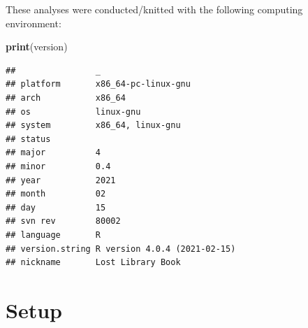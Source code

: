 \documentclass[]{book}
\newenvironment{Shaded}{\begin{snugshade}}{\end{snugshade}}
\newcommand{\KeywordTok}[1]{\textcolor[rgb]{0.13,0.29,0.53}{\textbf{#1}}}
\newcommand{\NormalTok}[1]{#1}
\begin{document}
These analyses were conducted/knitted with the following computing environment:

\begin{Shaded}
\begin{Highlighting}[]
\KeywordTok{print}\NormalTok{(version)}
\end{Highlighting}
\end{Shaded}

\begin{verbatim}
##                _                           
## platform       x86_64-pc-linux-gnu         
## arch           x86_64                      
## os             linux-gnu                   
## system         x86_64, linux-gnu           
## status                                     
## major          4                           
## minor          0.4                         
## year           2021                        
## month          02                          
## day            15                          
## svn rev        80002                       
## language       R                           
## version.string R version 4.0.4 (2021-02-15)
## nickname       Lost Library Book
\end{verbatim}

\hypertarget{setup-2}{%
\section{Setup}\label{setup-2}}
\end{document}
